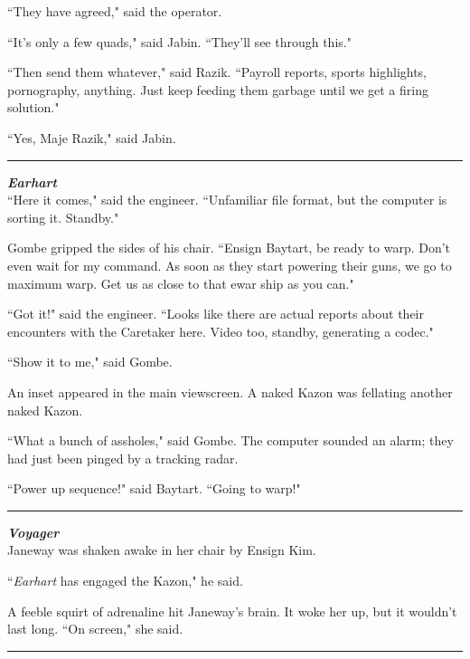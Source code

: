 \documentclass[twoside,letterpaper,12pt]{memoir}
\begin{document}
``They have agreed," said the operator.

``It's only a few quads," said Jabin. ``They'll see through this."

``Then send them whatever," said Razik. ``Payroll reports, sports highlights, pornography, anything. Just keep feeding them garbage until we get a firing solution."

``Yes, Maje Razik," said Jabin.

\begin{center}\rule{3cm}{0.4 pt}\end{center}

\noindent\textit{\textbf{Earhart}}\\

``Here it comes," said the engineer. ``Unfamiliar file format, but the computer is sorting it. Standby."

Gombe gripped the sides of his chair. ``Ensign Baytart, be ready to warp. Don't even wait for my command. As soon as they start powering their guns, we go to maximum warp. Get us as close to that ewar ship as you can."

``Got it!" said the engineer. ``Looks like there are actual reports about their encounters with the Caretaker here. Video too, standby, generating a codec."

``Show it to me," said Gombe.

An inset appeared in the main viewscreen. A naked Kazon was fellating another naked Kazon.

``What a bunch of assholes," said Gombe. The computer sounded an alarm; they had just been pinged by a tracking radar.

``Power up sequence!" said Baytart. ``Going to warp!"

\begin{center}\rule{3cm}{0.4 pt}\end{center}

\noindent\textit{\textbf{Voyager}}\\

Janeway was shaken awake in her chair by Ensign Kim.

``\textit{Earhart} has engaged the Kazon," he said.

A feeble squirt of adrenaline hit Janeway's brain. It woke her up, but it wouldn't last long. ``On screen," she said.

\begin{center}\rule{3cm}{0.4 pt}\end{center}
\end{document}
